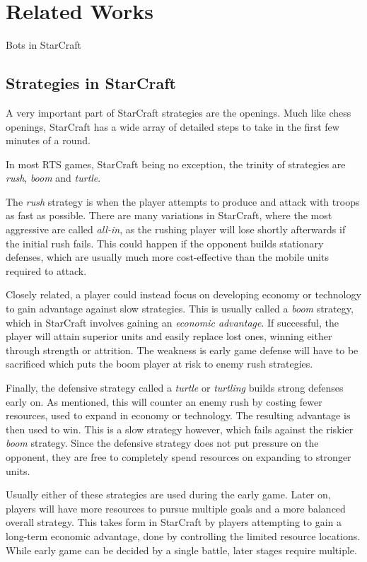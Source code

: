 \chapter{Related Works}
Bots in StarCraft

\section{Strategies in StarCraft}
A very important part of StarCraft strategies are the openings. Much like chess openings, StarCraft has a wide array of detailed steps to take in the first few minutes of a round.

In most RTS games, StarCraft being no exception, the trinity of strategies are \emph{rush}, \emph{boom} and \emph{turtle}.

The \emph{rush} strategy is when the player attempts to produce and attack with troops as fast as possible. There are many variations in StarCraft, where the most aggressive are called \emph{all-in}, as the rushing player will lose shortly afterwards if the initial rush fails. This could happen if the opponent builds stationary defenses, which are usually much more cost-effective than the mobile units required to attack.

Closely related, a player could instead focus on developing economy or technology to gain advantage against slow strategies. This is usually called a \emph{boom} strategy, which in StarCraft involves gaining an \emph{economic advantage}. If successful, the player will attain superior units and easily replace lost ones, winning either through strength or attrition. The weakness is early game defense will have to be sacrificed which puts the boom player at risk to enemy rush strategies.

Finally, the defensive strategy called a \emph{turtle} or \emph{turtling} builds strong defenses early on. As mentioned, this will counter an enemy rush by costing fewer resources, used to expand in economy or technology. The resulting advantage is then used to win. This is a slow strategy however, which fails against the riskier \emph{boom} strategy. Since the defensive strategy does not put pressure on the opponent, they are free to completely spend resources on expanding to stronger units.

Usually either of these strategies are used during the early game. Later on, players will have more resources to pursue multiple goals and a more balanced overall strategy. This takes form in StarCraft by players attempting to gain a long-term economic advantage, done by controlling the limited resource locations. While early game can be decided by a single battle, later stages require multiple.

